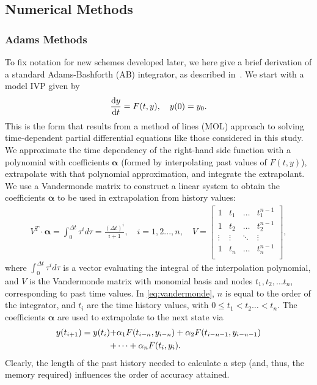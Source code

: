 \subsection{Numerical Methods}

\subsubsection{Adams Methods}

To fix notation for new schemes developed later, we here give a brief
derivation of a standard Adams-Bashforth (AB) integrator, as described
in~\cite{bashforth1883attempt}.  We start with a model IVP given by
\begin{align}
\frac{\text{d}y}{\text{d}t} = F(t,y), \quad y(0) = y_{0}. \notag
\end{align}
This is the form that results from a method of lines (MOL) approach to solving
time-dependent partial differential equations like those considered in this
study.  We approximate the time dependency of the right-hand side function with
a polynomial with coefficients $\boldsymbol{\alpha}$ (formed by interpolating
past values of $F(t,y)$), extrapolate with that polynomial approximation, and
integrate the extrapolant.  We use a Vandermonde matrix to construct a linear
system to obtain the coefficients $\boldsymbol{\alpha}$ to be used in
extrapolation from history values:
\begin{align}
V^{T} \cdot \boldsymbol{\alpha} = \int_0^{\Delta t} \tau^{i} d\tau = \frac{(\Delta t)^{i}}{i+1}, \quad i = 1,2...,n, \quad V = \begin{bmatrix}
    1 & t_{1} &  \hdots   & t_{1}^{n-1}  \\
    1 & t_{2} & \hdots &  t_{2}^{n-1} \\
      \vdots  & \vdots  &  \ddots   &  \vdots   \\
       1 &   t_{n}  &  \hdots  & t_{n}^{n-1} \\
        \end{bmatrix}, \label{eq:vandermonde}
\end{align}
where $\int_0^{\Delta t} \tau^{i} d\tau$ is a vector evaluating the integral of
the interpolation polynomial, and $V$ is the Vandermonde matrix with monomial
basis and nodes $t_{1}, t_{2}, \hdots t_{n}$, corresponding to past time
values. In \eqref{eq:vandermonde}, $n$ is equal to the order of the integrator,
and $t_{i}$ are the time history values, with $0 \leq t_{1} < t_{2} \hdots <
t_{n}$.  The coefficients $\boldsymbol{\alpha}$ are used to extrapolate to the
next state via
\begin{align}
y(t_{i+1}) = y(t_{i}) +& \alpha_{1}F(t_{i-n},y_{i-n}) + \alpha_{2}F(t_{i-n-1},y_{i-n-1}) \notag \\
+& \cdots + \alpha_{n}F(t_{i},y_{i}). \label{eq:ab_general}
\end{align}
Clearly, the length of the past history needed to calculate a step (and, thus, the memory required) influences the order of accuracy attained.

